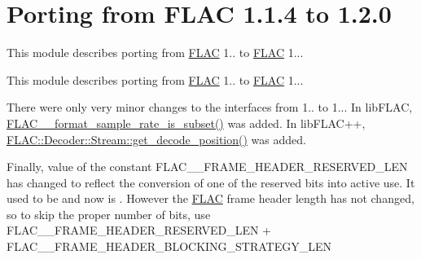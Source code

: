 \hypertarget{group__porting__1__1__4__to__1__2__0}{}\section{Porting from F\+L\+AC 1.1.4 to 1.2.0}
\label{group__porting__1__1__4__to__1__2__0}


This module describes porting from \hyperlink{namespace_f_l_a_c}{F\+L\+AC} 1.. to \hyperlink{namespace_f_l_a_c}{F\+L\+AC} 1...  


This module describes porting from \hyperlink{namespace_f_l_a_c}{F\+L\+AC} 1.. to \hyperlink{namespace_f_l_a_c}{F\+L\+AC} 1... 

There were only very minor changes to the interfaces from 1.. to 1... In lib\+F\+L\+AC, {\ttfamily \hyperlink{group__flac__format_ga996f8732a2502ad79a68bb4a9f945235}{F\+L\+A\+C\+\_\+\+\_\+format\+\_\+sample\+\_\+rate\+\_\+is\+\_\+subset()}} was added. In lib\+F\+L\+A\+C++, {\ttfamily \hyperlink{class_f_l_a_c_1_1_decoder_1_1_stream_af4fbbdd0ea096a77037f1d53dcade7f1}{F\+L\+A\+C\+::\+Decoder\+::\+Stream\+::get\+\_\+decode\+\_\+position()}} was added.

Finally, value of the constant {\ttfamily F\+L\+A\+C\+\_\+\+\_\+\+F\+R\+A\+M\+E\+\_\+\+H\+E\+A\+D\+E\+R\+\_\+\+R\+E\+S\+E\+R\+V\+E\+D\+\_\+\+L\+EN} has changed to reflect the conversion of one of the reserved bits into active use. It used to be {} and now is {}. However the \hyperlink{namespace_f_l_a_c}{F\+L\+AC} frame header length has not changed, so to skip the proper number of bits, use {\ttfamily F\+L\+A\+C\+\_\+\+\_\+\+F\+R\+A\+M\+E\+\_\+\+H\+E\+A\+D\+E\+R\+\_\+\+R\+E\+S\+E\+R\+V\+E\+D\+\_\+\+L\+EN} + {\ttfamily F\+L\+A\+C\+\_\+\+\_\+\+F\+R\+A\+M\+E\+\_\+\+H\+E\+A\+D\+E\+R\+\_\+\+B\+L\+O\+C\+K\+I\+N\+G\+\_\+\+S\+T\+R\+A\+T\+E\+G\+Y\+\_\+\+L\+EN} 